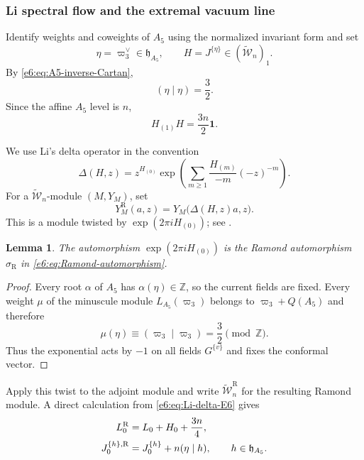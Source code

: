\documentclass[11pt,reqno]{amsart}
\newtheorem{lemma}[theorem]{Lemma}
\theoremstyle{definition}
\theoremstyle{remark}
\begin{document}
\subsubsection{Li spectral flow and the extremal vacuum line}


Identify weights and coweights of $A_5$ using the normalized invariant form and
set
\begin{equation*}
  \eta=\varpi_3^\vee\in\mathfrak h_{A_5},
  \qquad
  H=J^{\{\eta\}}\in(\widetilde{\mathcal W}_n)_1.
\end{equation*}
By \eqref{e6:eq:A5-inverse-Cartan},
\begin{equation*}
  (\eta\mid\eta)=\frac32.
\end{equation*}
Since the affine $A_5$ level is $n$,
\begin{equation*}
  H_{(1)}H=\frac{3n}{2}\mathbf1.
\end{equation*}

We use Li's delta operator in the convention
\begin{equation}\label{e6:eq:Li-delta-E6}
  \Delta(H,z)
  =z^{H_{(0)}}
   \exp\left(
     \sum_{m\ge1}\frac{H_{(m)}}{-m}(-z)^{-m}
   \right).
\end{equation}
For a $\widetilde{\mathcal W}_n$-module $(M,Y_M)$, set
\begin{equation*}
  Y_M^{\mathrm R}(a,z)
  =Y_M\bigl(\Delta(H,z)a,z\bigr).
\end{equation*}
This is a module twisted by
$\exp(2\pi iH_{(0)})$; see \cite{Li2012}.

\begin{lemma}
The automorphism $\exp(2\pi iH_{(0)})$ is the Ramond automorphism
$\sigma_{\mathrm R}$ in \eqref{e6:eq:Ramond-automorphism}.
\end{lemma}

\begin{proof}
Every root $\alpha$ of $A_5$ has $\alpha(\eta)\in\mathbb Z$, so the current
fields are fixed.  Every weight $\mu$ of the minuscule module
$L_{A_5}(\varpi_3)$ belongs to $\varpi_3+Q(A_5)$ and therefore
\[
  \mu(\eta)
  \equiv(\varpi_3\mid\varpi_3)
  =\frac32
  \pmod{\mathbb Z}.
\]
Thus the exponential acts by $-1$ on all fields $G^{\{v\}}$ and fixes the
conformal vector.
\end{proof}

Apply this twist to the adjoint module and write
$\widetilde{\mathcal W}_n^{\mathrm R}$ for the resulting Ramond module.  A
direct calculation from \eqref{e6:eq:Li-delta-E6} gives
\begin{align}
  L_0^{\mathrm R}
  &=L_0+H_0+\frac{3n}{4},
  \notag\\
  J_0^{\{h\},\mathrm R}
  &=J_0^{\{h\}}+n(\eta\mid h),
  \qquad h\in\mathfrak h_{A_5}.
  \label{e6:eq:Li-shift-Cartan-E6}
\end{align}
\end{document}
